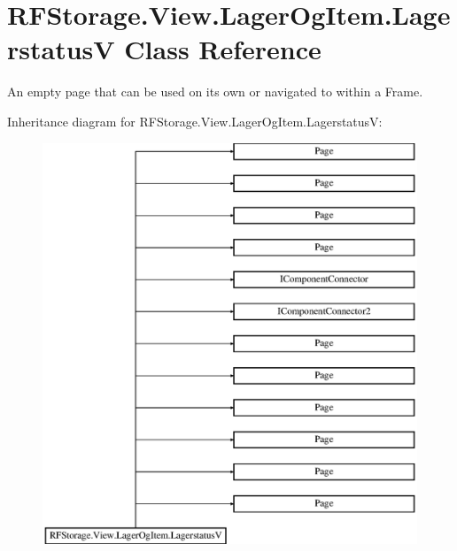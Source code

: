 \hypertarget{class_r_f_storage_1_1_view_1_1_lager_og_item_1_1_lagerstatus_v}{}\section{R\+F\+Storage.\+View.\+Lager\+Og\+Item.\+LagerstatusV Class Reference}
\label{class_r_f_storage_1_1_view_1_1_lager_og_item_1_1_lagerstatus_v}


An empty page that can be used on its own or navigated to within a Frame.  


Inheritance diagram for R\+F\+Storage.\+View.\+Lager\+Og\+Item.\+LagerstatusV\+:\begin{figure}[H]
\begin{center}
\leavevmode
\includegraphics[height=12.000000cm]{class_r_f_storage_1_1_view_1_1_lager_og_item_1_1_lagerstatus_v}
\end{center}
\end{figure}
